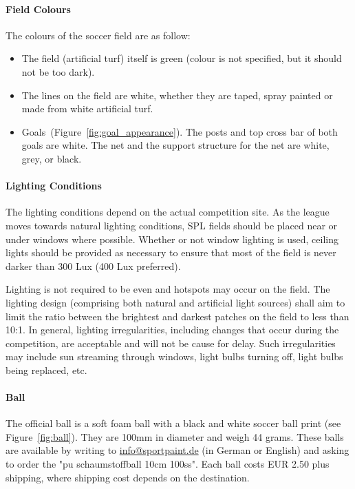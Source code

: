 \paragraph{Field Colours}
\label{sec:field_colors}
The colours of the soccer field are as follow:

\begin{itemize}
	\item The field (artificial turf) itself is green (colour is not specified, but it should not be too dark).
	
	\item The lines on the field are white, whether they are taped, spray painted or made from white artificial turf.
	
	\item Goals~(\cf Figure~\ref{fig:goal_appearance}). The posts and top cross bar of both goals are white. The net and the support structure for the net are white, grey, or black.
\end{itemize}

\paragraph{Lighting Conditions}
\label{sec:lightConditions}
The lighting conditions depend on the actual competition site. As the league moves towards natural lighting conditions, SPL fields should be placed near or under windows where possible. Whether or not window lighting is used, ceiling lights should be provided as necessary to ensure that most of the field is never darker than 300 Lux (400 Lux preferred).

Lighting is not required to be even and hotspots may occur on the field. The lighting design (comprising both natural and artificial light sources) shall aim to limit the ratio between the brightest and darkest patches on the field to less than 10:1. In general, lighting irregularities, including changes that occur during the competition, are acceptable and will not be cause for delay. Such irregularities may include sun streaming through windows, light bulbs turning off, light bulbs being replaced, etc.

\paragraph{Ball}
\label{sec:ball}

The official ball is a soft foam ball with a black and white soccer ball print (see Figure~\ref{fig:ball}). They are 100mm in diameter and weigh 44 grams. These balls are available by writing to \url{info@sportpaint.de} (in German or English) and asking to order the "pu schaumstoffball 10cm 100ss".  Each ball costs EUR 2.50 plus shipping, where shipping cost depends on the destination.

